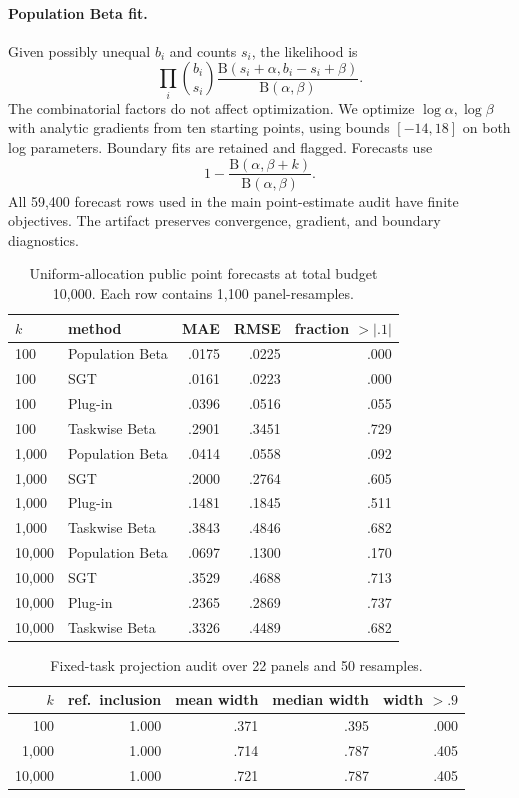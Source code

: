 \documentclass[twoside]{article}
\begin{document}
\paragraph{Population Beta fit.}
Given possibly unequal \(b_i\) and counts \(s_i\), the likelihood is
\[
 \prod_i
 \binom{b_i}{s_i}
 \frac{\mathrm B(s_i+\alpha,b_i-s_i+\beta)}
      {\mathrm B(\alpha,\beta)}.
\]
The combinatorial factors do not affect optimization. We optimize
\(\log\alpha,\log\beta\) with analytic gradients from ten starting points,
using bounds \([-14,18]\) on both log parameters. Boundary fits are retained
and flagged. Forecasts use
\[
 1-\frac{\mathrm B(\alpha,\beta+k)}
          {\mathrm B(\alpha,\beta)}.
\]
All 59,400 forecast rows used in the main point-estimate audit have finite
objectives. The artifact preserves convergence, gradient, and boundary
diagnostics.

\begin{table}[t]
\caption{Uniform-allocation public point forecasts at total budget 10,000.
Each row contains 1,100 panel-resamples.}
\label{tab:public-full}
\centering
\scriptsize
\setlength{\tabcolsep}{3pt}
\begin{tabular}{llrrr}
\toprule
\(k\) & method & MAE & RMSE & fraction \(>|.1|\)\\
\midrule
100 & Population Beta & .0175 & .0225 & .000\\
100 & SGT & .0161 & .0223 & .000\\
100 & Plug-in & .0396 & .0516 & .055\\
100 & Taskwise Beta & .2901 & .3451 & .729\\
\midrule
1,000 & Population Beta & .0414 & .0558 & .092\\
1,000 & SGT & .2000 & .2764 & .605\\
1,000 & Plug-in & .1481 & .1845 & .511\\
1,000 & Taskwise Beta & .3843 & .4846 & .682\\
\midrule
10,000 & Population Beta & .0697 & .1300 & .170\\
10,000 & SGT & .3529 & .4688 & .713\\
10,000 & Plug-in & .2365 & .2869 & .737\\
10,000 & Taskwise Beta & .3326 & .4489 & .682\\
\bottomrule
\end{tabular}
\end{table}

\begin{table}[t]
\caption{Fixed-task projection audit over 22 panels and 50 resamples.}
\label{tab:projection-public}
\centering
\scriptsize
\setlength{\tabcolsep}{2pt}
\begin{tabular}{rrrrr}
\toprule
\(k\) & ref.\ inclusion & mean width & median width & width \(>.9\)\\
\midrule
100 & 1.000 & .371 & .395 & .000\\
1,000 & 1.000 & .714 & .787 & .405\\
10,000 & 1.000 & .721 & .787 & .405\\
\bottomrule
\end{tabular}
\end{table}
\end{document}
